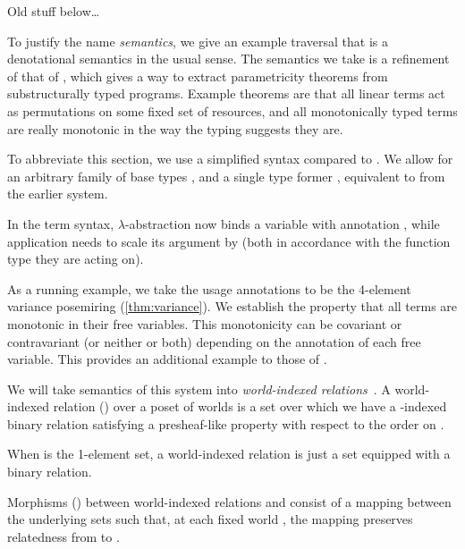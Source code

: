 {\color{red}Old stuff below\ldots}

To justify the name \emph{semantics}, we give an example traversal that is a
denotational semantics in the usual sense.
The semantics we take is a refinement of that of \citet{AbelBernardy2020},
which gives a way to extract parametricity theorems from substructurally typed
programs.
Example theorems are that all linear terms act as permutations on some fixed
set of resources, and all monotonically typed terms are really monotonic in the
way the typing suggests they are.

To abbreviate this section, we use a simplified syntax compared to \name{}.
We allow for an arbitrary family of base types , and a single
type former \mbox{}, equivalent to
\mbox{} from the earlier system.


In the term syntax, $\lambda$-abstraction now binds a variable with annotation
, while application needs to scale its argument by 
(both in accordance with the function type they are acting on).


As a running example, we take the usage annotations to be the 4-element
variance posemiring (\cref{thm:variance}).
We establish the property that all terms are monotonic in their free variables.
This monotonicity can be covariant or contravariant (or neither or both)
depending on the annotation of each free variable.
This provides an additional example to those of \citeauthor{AbelBernardy2020}.

We will take semantics of this system into
\emph{world-indexed relations}~\cite{AbelBernardy2020,context-constrained}.
A world-indexed relation () over a poset of worlds
 is a set over which
we have a -indexed binary relation satisfying a presheaf-like
property with respect to the order on .


\begin{example}
  When  is the 1-element set, a world-indexed relation is just a
  set equipped with a binary relation.
\end{example}

Morphisms () between world-indexed relations 
and  consist of a mapping between the underlying sets such that, at
each fixed world , the mapping preserves relatedness from
 to .

